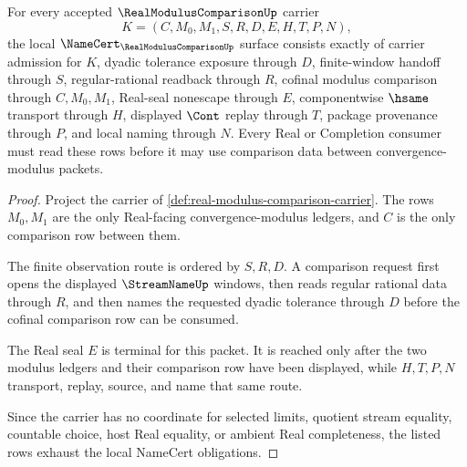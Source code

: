 \begin{theorem}
\label{thm:real-modulus-comparison-namecert-obligations}
For every accepted $\RealModulusComparisonUp$ carrier
$$
K=(C,M_0,M_1,S,R,D,E,H,T,P,N),
$$
the local $\NameCert_{\RealModulusComparisonUp}$ surface consists exactly of carrier admission for $K$, dyadic tolerance exposure through $D$, finite-window handoff through $S$, regular-rational readback through $R$, cofinal modulus comparison through $C,M_0,M_1$, Real-seal nonescape through $E$, componentwise $\hsame$ transport through $H$, displayed $\Cont$ replay through $T$, package provenance through $P$, and local naming through $N$. Every Real or Completion consumer must read these rows before it may use comparison data between convergence-modulus packets.
\end{theorem}
\begin{proof}
Project the carrier of \autoref{def:real-modulus-comparison-carrier}. The rows $M_0,M_1$ are the only Real-facing convergence-modulus ledgers, and $C$ is the only comparison row between them.

The finite observation route is ordered by $S,R,D$. A comparison request first opens the displayed $\StreamNameUp$ windows, then reads regular rational data through $R$, and then names the requested dyadic tolerance through $D$ before the cofinal comparison row can be consumed.

The Real seal $E$ is terminal for this packet. It is reached only after the two modulus ledgers and their comparison row have been displayed, while $H,T,P,N$ transport, replay, source, and name that same route.

Since the carrier has no coordinate for selected limits, quotient stream equality, countable choice, host Real equality, or ambient Real completeness, the listed rows exhaust the local NameCert obligations.
\end{proof}



